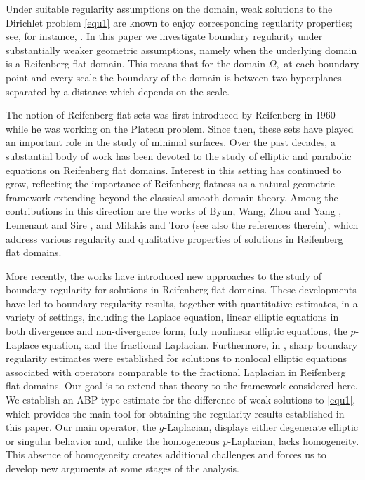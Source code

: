 \documentclass[11pt, leqno]{article}
\theoremstyle{definition}
\theoremstyle{remark}
\numberwithin{equation}{section}
\begin{document}
Under suitable regularity assumptions on the domain, weak solutions to the Dirichlet problem \eqref{equ1} are known to enjoy corresponding regularity properties; see, for instance, \cite{BraSou25}. In this paper we investigate boundary regularity under substantially weaker geometric assumptions, namely when the underlying domain is a Reifenberg flat domain. This means that for the domain $\Omega,$ at each boundary point and every scale the boundary of the domain is between two hyperplanes separated by a distance which depends on the scale.

The notion of Reifenberg-flat sets was first introduced by Reifenberg in 1960 \cite{Reif} while he was working on the Plateau problem. Since then, these sets have played an important role in the study of minimal surfaces. Over the past decades, a substantial body of work has been devoted to the study of elliptic and parabolic equations on Reifenberg flat domains. Interest in this setting has continued to grow, reflecting the importance of Reifenberg flatness as a natural geometric framework extending beyond the classical smooth-domain theory. Among the contributions in this direction are the works of Byun, Wang, Zhou and Yang \cite{By1, By2, By3}, Lemenant and Sire \cite{ Leme3}, and Milakis and Toro \cite{Mila} (see also the references therein), which address various regularity and qualitative properties of solutions in Reifenberg flat domains. 

More recently, the works \cite{Wu, Et, Lian} have introduced new approaches to the study of boundary regularity for solutions in Reifenberg flat domains. These developments have led to boundary regularity results, together with quantitative estimates, in a variety of settings, including the Laplace equation, linear elliptic equations in both divergence and non-divergence form, fully nonlinear elliptic equations, the \(p\)-Laplace equation, and the fractional Laplacian. Furthermore, in \cite{Prade}, sharp boundary regularity estimates were established for solutions to nonlocal elliptic equations associated with operators comparable to the fractional Laplacian in Reifenberg flat domains. Our goal is to extend that theory to the framework considered here. We establish an ABP-type estimate for the difference of weak solutions to \eqref{equ1}, which provides the main tool for obtaining the regularity results established in this paper. Our main operator, the \(g\)-Laplacian, displays either degenerate elliptic or singular behavior and, unlike the homogeneous \(p\)-Laplacian, lacks homogeneity. This absence of homogeneity creates additional challenges and forces us to develop new arguments at some stages of the analysis.
\end{document}
